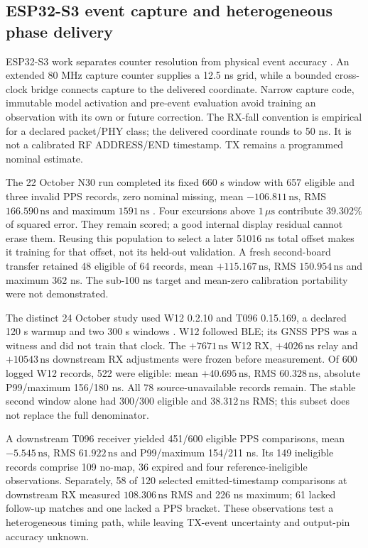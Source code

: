 \documentclass[11pt,letterpaper]{article}
\newcommand{\us}{\,\mu\mathrm{s}}\newcommand{\ns}{\,\mathrm{ns}}
\begin{document}
\subsection{ESP32-S3 event capture and heterogeneous phase delivery}
ESP32-S3 work separates counter resolution from physical event accuracy \cite{s3fine,s3low}. An extended 80 MHz capture counter supplies a 12.5 ns grid, while a bounded cross-clock bridge connects capture to the delivered coordinate. Narrow capture code, immutable model activation and pre-event evaluation avoid training an observation with its own or future correction. The RX-fall convention is empirical for a declared packet/PHY class; the delivered coordinate rounds to 50 ns. It is not a calibrated RF ADDRESS/END timestamp. TX remains a programmed nominal estimate.

The 22 October N30 run completed its fixed 660 s window with 657 eligible and three invalid PPS records, zero nominal missing, mean $-106.811\ns$, RMS $166.590\ns$ and maximum $1591\ns$ \cite{s3fine}. Four excursions above $1\us$ contribute 39.302\% of squared error. They remain scored; a good internal display residual cannot erase them. Reusing this population to select a later 51016 ns total offset makes it training for that offset, not its held-out validation. A fresh second-board transfer retained 48 eligible of 64 records, mean $+115.167\ns$, RMS $150.954\ns$ and maximum 362 ns. The sub-100 ns target and mean-zero calibration portability were not demonstrated.

The distinct 24 October study used W12 0.2.10 and T096 0.15.169, a declared 120 s warmup and two 300 s windows \cite{w12utc}. W12 followed BLE; its GNSS PPS was a witness and did not train that clock. The $+7671\ns$ W12 RX, $+4026\ns$ relay and $+10543\ns$ downstream RX adjustments were frozen before measurement. Of 600 logged W12 records, 522 were eligible: mean $+40.695\ns$, RMS $60.328\ns$, absolute P99/maximum 156/180 ns. All 78 source-unavailable records remain. The stable second window alone had 300/300 eligible and $38.312\ns$ RMS; this subset does not replace the full denominator.

A downstream T096 receiver yielded 451/600 eligible PPS comparisons, mean $-5.545\ns$, RMS $61.922\ns$ and P99/maximum 154/211 ns. Its 149 ineligible records comprise 109 no-map, 36 expired and four reference-ineligible observations. Separately, 58 of 120 selected emitted-timestamp comparisons at downstream RX measured $108.306\ns$ RMS and 226 ns maximum; 61 lacked follow-up matches and one lacked a PPS bracket. These observations test a heterogeneous timing path, while leaving TX-event uncertainty and output-pin accuracy unknown.
\end{document}

